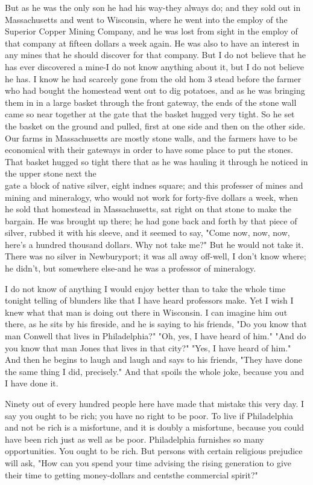 \documentclass[10pt]{article}
\begin{document}
But as he was the only son he had his way-they always do; and they sold out in Massachusetts and went to Wisconsin, where he went into the employ of the Superior Copper Mining Company, and he was lost from sight in the employ of that company at fifteen dollars a week again. He was also to have an interest in any mines that he should discover for that company. But I do not believe that he has ever discovered a mine-I do not know anything about it, but I do not believe he has. I know he had scarcely gone from the old hom 3 stead before the farmer who had bought the homestead went out to dig potatoes, and as he was bringing them in in a large basket through the front gateway, the ends of the stone wall came so near together at the gate that the basket hugged very tight. So he set the basket on the ground and pulled, first at one side and then on the other side. Our farms in Massachusetts are mostly stone walls, and the farmers have to be economical with their gateways in order to have some place to put the stones. That basket hugged so tight there that as he was hauling it through he noticed in the upper stone next the\\
gate a block of native silver, eight indnes square; and this professer of mines and mining and mineralogy, who would not work for forty-five dollars a week, when he sold that homestead in Massachusetts, sat right on that stone to make the bargain. He was brought up there; he had gone back and forth by that piece of silver, rubbed it with his sleeve, and it seemed to say, "Come now, now, now, here's a hundred thousand dollars. Why not take me?" But he would not take it. There was no silver in Newburyport; it was all away off-well, I don't know where; he didn't, but somewhere else-and he was a professor of mineralogy.

I do not know of anything I would enjoy better than to take the whole time tonight telling of blunders like that I have heard professors make. Yet I wish I knew what that man is doing out there in Wisconsin. I can imagine him out there, as he sits by his fireside, and he is saying to his friends, "Do you know that man Conwell that lives in Philadelphia?" "Oh, yes, I have heard of him." "And do you know that man Jones that lives in that city?" "Yes, I have heard of him." And then he begins to laugh and laugh and says to his friends, "They have done the same thing I did, precisely." And that spoils the whole joke, because you and I have done it.

Ninety out of every hundred people here have made that mistake this very day. I say you ought to be rich; you have no right to be poor. To live if Philadelphia and not be rich is a misfortune, and it is doubly a misfortune, because you could have been rich just as well as be poor. Philadelphia furnishes so many opportunities. You ought to be rich. But persons with certain religious prejudice will ask, "How can you spend your time advising the rising generation to give their time to getting money-dollars and centsthe commercial spirit?"
\end{document}
